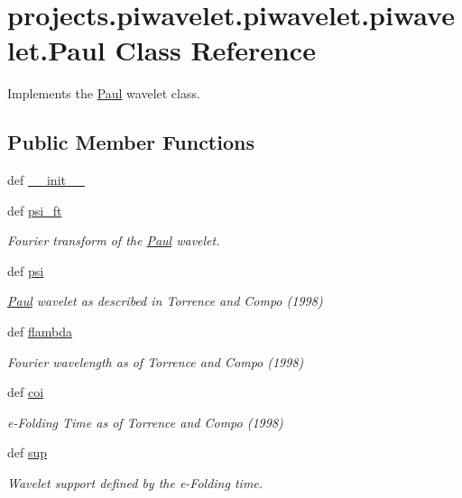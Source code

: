 \hypertarget{classprojects_1_1piwavelet_1_1piwavelet_1_1piwavelet_1_1Paul}{\section{projects.\-piwavelet.\-piwavelet.\-piwavelet.\-Paul Class Reference}
\label{classprojects_1_1piwavelet_1_1piwavelet_1_1piwavelet_1_1Paul}
}


Implements the \hyperlink{classprojects_1_1piwavelet_1_1piwavelet_1_1piwavelet_1_1Paul}{Paul} wavelet class.  


\subsection*{Public Member Functions}
\begin{DoxyCompactItemize}
\item 
def \hyperlink{classprojects_1_1piwavelet_1_1piwavelet_1_1piwavelet_1_1Paul_a115fa89938c7a613829e0d0bbd5a3d21}{\-\_\-\-\_\-init\-\_\-\-\_\-}
\item 
def \hyperlink{classprojects_1_1piwavelet_1_1piwavelet_1_1piwavelet_1_1Paul_acdbf979a24cf0ae8132808bd47dfbceb}{psi\-\_\-ft}
\begin{DoxyCompactList}\small\item\em Fourier transform of the \hyperlink{classprojects_1_1piwavelet_1_1piwavelet_1_1piwavelet_1_1Paul}{Paul} wavelet. \end{DoxyCompactList}\item 
def \hyperlink{classprojects_1_1piwavelet_1_1piwavelet_1_1piwavelet_1_1Paul_aa965d2f36708276356acf9f11ba3e178}{psi}
\begin{DoxyCompactList}\small\item\em \hyperlink{classprojects_1_1piwavelet_1_1piwavelet_1_1piwavelet_1_1Paul}{Paul} wavelet as described in Torrence and Compo (1998) \end{DoxyCompactList}\item 
def \hyperlink{classprojects_1_1piwavelet_1_1piwavelet_1_1piwavelet_1_1Paul_acfe3ffb3c21db65c3bb632bdd055814f}{flambda}
\begin{DoxyCompactList}\small\item\em Fourier wavelength as of Torrence and Compo (1998) \end{DoxyCompactList}\item 
def \hyperlink{classprojects_1_1piwavelet_1_1piwavelet_1_1piwavelet_1_1Paul_a9f5568565b2463e3cc281aa96cd8b75c}{coi}
\begin{DoxyCompactList}\small\item\em e-\/\-Folding Time as of Torrence and Compo (1998) \end{DoxyCompactList}\item 
def \hyperlink{classprojects_1_1piwavelet_1_1piwavelet_1_1piwavelet_1_1Paul_a9543cbaff6e22b8d2df7765797f5b595}{sup}
\begin{DoxyCompactList}\small\item\em Wavelet support defined by the e-\/\-Folding time. \end{DoxyCompactList}\end{DoxyCompactItemize}
